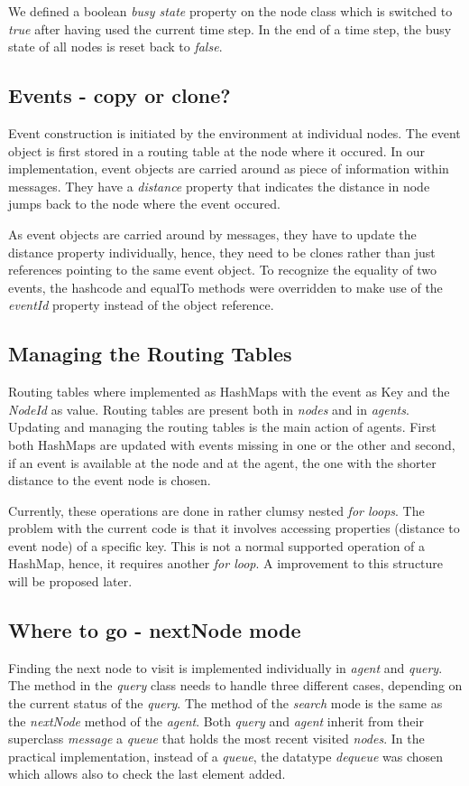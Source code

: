 \documentclass[a4paper,11pt,twoside]{article}
\begin{document}
We defined a boolean \textit{busy state} property on the node class
which is switched to \textit{true} after having used the current time
step. In the end of a time step, the busy state of all nodes is reset
back to \textit{false}.

\subsection{Events - copy or clone?}
Event construction is initiated by the environment at individual
nodes. The event object is first stored in a routing table at the
node where it occured. In our implementation, event objects are
carried around as piece of information within messages. They have a
\textit{distance} property that indicates the distance in node jumps
back to the node where the event occured.

As event objects are carried around by messages, they have to update
the distance property individually, hence, they need to be clones rather than
just references pointing to the same event object. To recognize the
equality of two events, the hashcode and equalTo methods were
overridden to make use of the \textit{eventId} property instead of the
object reference.

\subsection{Managing the Routing Tables}
Routing tables where implemented as HashMaps with the event as Key and
the \textit{NodeId} as value. Routing tables are present both in \textit{nodes}
and in \textit{agents}. Updating and managing the routing tables
is the main action of agents. First both HashMaps are updated with
events missing in one or the other and second, if an event is
available at the node and at the agent, the one with the shorter
distance to the event node is chosen.

Currently, these operations are done in rather clumsy nested
\textit{for loops}. The problem with the current code is that it involves
accessing properties (distance to event node) of a specific key. This
is not a normal supported operation of a HashMap, hence, it requires
another \textit{for loop}. A improvement to this structure will be
proposed later. 


\subsection{Where to go - nextNode mode}
Finding the next node to visit is implemented individually in 
\textit{agent} and \textit{query}. The method in the \textit{query}
class needs to handle three different cases, depending on the current
status of the \textit{query}. The method of the \textit{search} mode
is the same as the \textit{nextNode} method of the
\textit{agent}. Both \textit{query} and \textit{agent} inherit from 
their superclass \textit{message} a \textit{queue} that holds the most
recent visited \textit{nodes}. In the practical implementation,
instead of a \textit{queue}, the  datatype \textit{dequeue} was chosen
which allows also to check the last element added.
\end{document}
